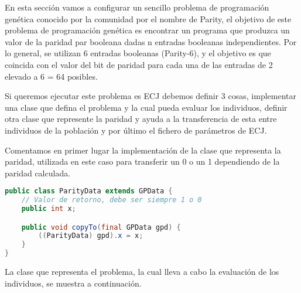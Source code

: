 En esta sección vamos a configurar un sencillo problema de programación genética conocido por la comunidad por el nombre de Parity, el objetivo de este problema de programación genética es encontrar un programa que produzca un valor de la paridad par booleana dadas n entradas booleanas independientes. Por lo general, se utilizan 6 entradas booleanas (Parity-6), y el objetivo es que coincida con el valor del bit de paridad para cada una de las entradas de 2 elevado a 6 = 64 posibles.

Si queremos ejecutar este problema es ECJ debemos definir 3 cosas, implementar una clase que defina el problema y la cual pueda evaluar los individuos, definir otra clase que represente la paridad y ayuda a la transferencia de esta entre individuos de la población y por \'ultimo el fichero de par\'ametros de ECJ.

Comentamos en primer lugar la implementación de la clase que representa la paridad, utilizada en este caso para transferir un 0 o un 1 dependiendo de la paridad calculada.

\begin{lstlisting}[language=Java]
public class ParityData extends GPData {
	// Valor de retorno, debe ser siempre 1 o 0
	public int x;

	public void copyTo(final GPData gpd) {
		((ParityData) gpd).x = x;
	}
}
\end{lstlisting}

La clase que representa el problema, la cual lleva a cabo la evaluaci\'on de los individuos, se muestra a continuación.

